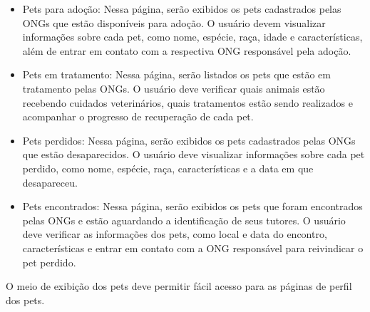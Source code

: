 \begin{itemize}[leftmargin=2cm]
\begin{itemize}[leftmargin=2cm]
\item Pets para adoção: Nessa página, serão exibidos os pets cadastrados pelas ONGs que estão disponíveis para adoção. O usuário devem visualizar informações sobre cada pet, como nome, espécie, raça, idade e características, além de entrar em contato com a respectiva ONG responsável pela adoção.
\item Pets em tratamento: Nessa página, serão listados os pets que estão em tratamento pelas ONGs. O usuário deve verificar quais animais estão recebendo cuidados veterinários, quais tratamentos estão sendo realizados e acompanhar o progresso de recuperação de cada pet.
\item Pets perdidos: Nessa página, serão exibidos os pets cadastrados pelas ONGs que estão desaparecidos. O usuário deve visualizar informações sobre cada pet perdido, como nome, espécie, raça, características e a data em que desapareceu.
\newpage
\item Pets encontrados: Nessa página, serão exibidos os pets que foram encontrados pelas ONGs e estão aguardando a identificação de seus tutores. O usuário deve verificar as informações dos pets, como local e data do encontro, características e entrar em contato com a ONG responsável para reivindicar o pet perdido.

\end{itemize}
O meio de exibição dos pets deve permitir fácil acesso para as páginas de perfil dos pets.

\end{itemize}


